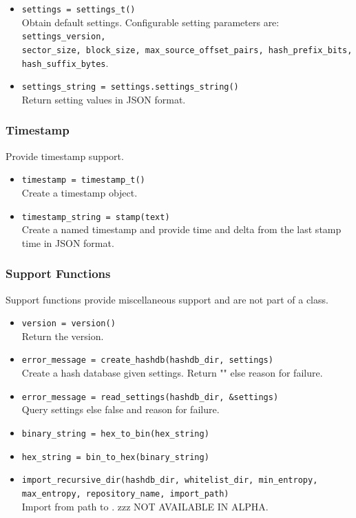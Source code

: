 \documentclass[11pt,fleqn]{article} %
\begin{document}
\begin{itemize}
\item \verb+settings = settings_t()+\\
Obtain default settings. Configurable setting parameters are: \verb+settings_version,+\\
\verb+sector_size, block_size, max_source_offset_pairs, hash_prefix_bits,+\\
\verb+hash_suffix_bytes+.
\item \verb+settings_string = settings.settings_string()+\\
Return setting values in JSON format.
\end{itemize}

\subsubsection{Timestamp}
Provide timestamp support.

\begin{itemize}
\item \verb+timestamp = timestamp_t()+\\
Create a timestamp object.
\item \verb+timestamp_string = stamp(text)+\\
Create a named timestamp and provide time and delta from the last stamp time in JSON format.
\end{itemize}

\subsubsection{Support Functions}
Support functions provide miscellaneous support and are not part of a class.
\begin{itemize}
\item \verb+version = version()+\\
Return the \hdb version.
\item \verb+error_message = create_hashdb(hashdb_dir, settings)+\\
Create a hash database given settings. Return "" else reason for failure.
\item \verb+error_message = read_settings(hashdb_dir, &settings)+\\
Query settings else false and reason for failure.
\item \verb+binary_string = hex_to_bin(hex_string)+
\item \verb+hex_string = bin_to_hex(binary_string)+
\item \verb+import_recursive_dir(hashdb_dir, whitelist_dir, min_entropy,+\\
\verb+max_entropy, repository_name, import_path)+\\
Import from path to \hdb. zzz NOT AVAILABLE IN ALPHA.
\end{itemize}
\end{document}
